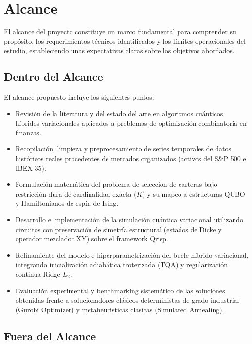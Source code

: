 \section{Alcance}

El alcance del proyecto constituye un marco fundamental para comprender su propósito, 
los requerimientos técnicos identificados y los límites operacionales del estudio, 
estableciendo unas expectativas claras sobre los objetivos abordados.

\subsection{Dentro del Alcance}
\label{subsec:dentro_alcance}

El alcance propuesto incluye los siguientes puntos:
\begin{itemize}
    \item Revisión de la literatura y del estado del arte en algoritmos cuánticos 
          híbridos variacionales aplicados a problemas de optimización combinatoria 
          en finanzas.
    \item Recopilación, limpieza y preprocesamiento de series temporales de datos 
          históricos reales procedentes de mercados organizados (activos del S\&P 500 
          e IBEX 35).
    \item Formulación matemática del problema de selección de carteras bajo 
          restricción dura de cardinalidad exacta ($K$) y su mapeo a estructuras QUBO 
          y Hamiltonianos de espín de Ising.
    \item Desarrollo e implementación de la simulación cuántica variacional 
          utilizando circuitos con preservación de simetría estructural (estados de 
          Dicke y operador mezclador XY) sobre el framework Qrisp.
    \item Refinamiento del modelo e hiperparametrización del bucle híbrido variacional, 
          integrando inicialización adiabática troterizada (TQA) y regularización continua 
          Ridge $L_2$.
    \item Evaluación experimental y benchmarking sistemático de las soluciones obtenidas 
          frente a solucionadores clásicos deterministas de grado industrial (Gurobi Optimizer) 
          y metaheurísticas clásicas (Simulated Annealing).
\end{itemize}

\subsection{Fuera del Alcance}
\label{subsec:fuera_alcance}


